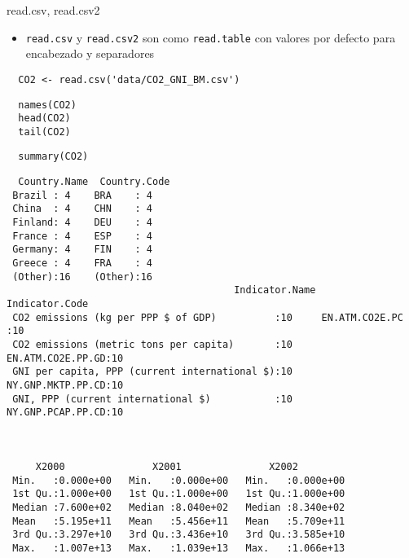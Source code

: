 \documentclass[xcolor={usenames,svgnames,dvipsnames}]{beamer}
\begin{document}
\begin{frame}[fragile,label=sec-2-3]{read.csv, read.csv2}
 \begin{itemize}
\item \texttt{read.csv} y \texttt{read.csv2} son como \texttt{read.table} con valores
por defecto para encabezado y separadores
\end{itemize}

\lstset{language=R,label= ,caption= ,numbers=none}
\begin{lstlisting}
  CO2 <- read.csv('data/CO2_GNI_BM.csv')
\end{lstlisting}

\lstset{language=R,label= ,caption= ,numbers=none}
\begin{lstlisting}
  names(CO2)
  head(CO2)
  tail(CO2)
\end{lstlisting}
\lstset{language=R,label= ,caption= ,numbers=none}
\begin{lstlisting}
  summary(CO2)
\end{lstlisting}

\begin{verbatim}
  Country.Name  Country.Code
 Brazil : 4    BRA    : 4   
 China  : 4    CHN    : 4   
 Finland: 4    DEU    : 4   
 France : 4    ESP    : 4   
 Germany: 4    FIN    : 4   
 Greece : 4    FRA    : 4   
 (Other):16    (Other):16   
                                       Indicator.Name           Indicator.Code
 CO2 emissions (kg per PPP $ of GDP)          :10     EN.ATM.CO2E.PC   :10    
 CO2 emissions (metric tons per capita)       :10     EN.ATM.CO2E.PP.GD:10    
 GNI per capita, PPP (current international $):10     NY.GNP.MKTP.PP.CD:10    
 GNI, PPP (current international $)           :10     NY.GNP.PCAP.PP.CD:10    
                                                                              
                                                                              
                                                                              
     X2000               X2001               X2002          
 Min.   :0.000e+00   Min.   :0.000e+00   Min.   :0.000e+00  
 1st Qu.:1.000e+00   1st Qu.:1.000e+00   1st Qu.:1.000e+00  
 Median :7.600e+02   Median :8.040e+02   Median :8.340e+02  
 Mean   :5.195e+11   Mean   :5.456e+11   Mean   :5.709e+11  
 3rd Qu.:3.297e+10   3rd Qu.:3.436e+10   3rd Qu.:3.585e+10  
 Max.   :1.007e+13   Max.   :1.039e+13   Max.   :1.066e+13  
                                                            

\end{verbatim}
\end{frame}
\end{document}
